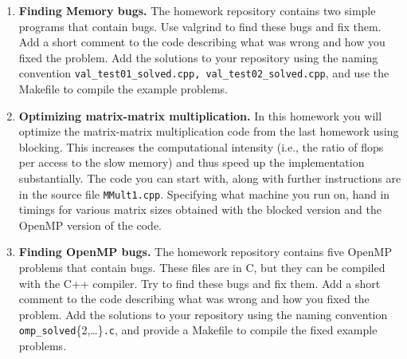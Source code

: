 \documentclass[12pt]{article}
\begin{document}
%
\begin{enumerate}
 \item {\bf Finding Memory bugs.}  The homework repository contains
   two simple programs that contain bugs. Use valgrind to find these
   bugs and fix them. Add a short comment to the code describing what
   was wrong and how you fixed the problem. Add the solutions to your
   repository using the naming convention
   \texttt{val\_test01\_solved.cpp, val\_test02\_solved.cpp}, and use
   the Makefile to compile the example problems.

  \item {\bf Optimizing matrix-matrix multiplication.} In this
    homework you will optimize the matrix-matrix multiplication code
    from the last homework using blocking. This increases the
    computational intensity (i.e., the ratio of flops per access to
    the slow memory) and thus speed up the implementation
    substantially. The code you can start with, along with further
    instructions are in the source file
    \texttt{MMult1.cpp}. Specifying what machine you run on, hand in
    timings for various matrix sizes obtained with the blocked version
    and the OpenMP version of the code.

\item {\bf Finding OpenMP bugs.}  The homework repository contains five
  OpenMP problems that contain bugs. These files are in C, but they
  can be compiled with the C++ compiler. Try to find these bugs and fix
  them. Add a short comment to the code describing what was wrong and
  how you fixed the problem. Add the solutions to your repository
  using the naming convention
  \texttt{omp\_solved}\{2,\ldots\}\texttt{.c}, and provide a Makefile
  to compile the fixed example problems.


\end{enumerate}
\end{document}
